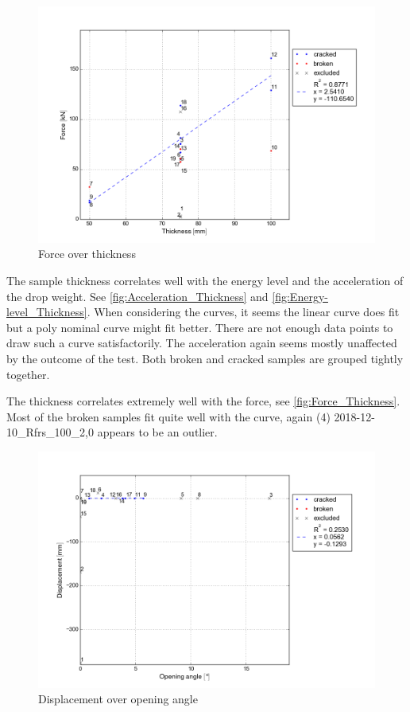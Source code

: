 \begin{figure}
    \centering
    \includegraphics[width=0.95 \linewidth]{./diagram/Force_Thickness}
    \caption{Force over thickness}
    \label{fig:Force_Thickness}
\end{figure}

The sample thickness correlates well with the energy level and the acceleration of the drop weight. See \autoref{fig:Acceleration_Thickness} and \autoref{fig:Energy-level_Thickness}. When considering the curves, it seems the linear curve does fit but a poly nominal curve might fit better. There are not enough data points to draw such a curve satisfactorily. The acceleration again seems mostly unaffected by the outcome of the test. Both broken and cracked samples are grouped tightly together.

The thickness correlates extremely well with the force, see \autoref{fig:Force_Thickness}. Most of the broken samples fit quite well with the curve, again (4) 2018-12-10\_Rfrs\_100\_2,0  appears to be an outlier.

\begin{figure}
    \centering
    \includegraphics[width=0.95 \linewidth]{./diagram/Displacement_Opening-angle}
    \caption{Displacement over opening angle}
    \label{fig:Displacement_Opening-angle}
\end{figure}

